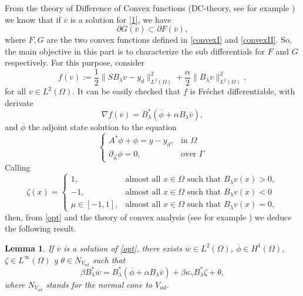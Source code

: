 \documentclass[11pt,a4paper]{amsart}
\newcommand{\om}{\Omega}
\newtheorem{lemma}{{Lemma}}
\newcommand{\norm}[1]{\lVert #1 \rVert}
\begin{document}
 From the theory of Difference of Convex functions (DC-theory, see for example \cite{dihn, merino})  we know that if $\overline{v}$ is a solution for \eqref{1}, we have 
\begin{equation}\label{opt}
    \partial G(\overline{v})\subset\partial F(\overline{v}),
\end{equation}
where $F, G$ are the two convex functions defined in \eqref{convexI} and \eqref{convexII}. So, the main objective in this part is to characterize the sub differentials for $F$ and $G$ respectively. For this purpose, consider
\[
	f(v):=\frac{1}{2}\norm{S	B_{\lambda}v-y_d}_{L^2(\om)}^2+\frac{\alpha}{2}\norm{	B_{\lambda}v}_{L^2(\om)}^2,
\]
for all $v\in L^2(\om)$. It can be easily checked that $f$ is Fréchet differentiable, with derivate 
\[\nabla f(\overline{v})=B_{\lambda}^*(\overline{\phi}+\alpha B_{\lambda}\overline{v}),
\]
and $\overline{\phi}$ the adjoint state solution to the equation 
\[
\begin{cases}
A^*\phi+\phi=y-y_{d}, &\mbox{in }\om\\
\partial_{\vec{n}}\phi=0,&\mbox{over }\Gamma
\end{cases}
\]
Calling 
\begin{equation}\label{zeta}
	\zeta(x)=\begin{cases}
		1, & \mbox{almost all }x\in \om \mbox{ such that } B_{\lambda}v(x)>0,\\
		-1, & \mbox{almost all }x\in \om \mbox{ such that }B_{\lambda}v(x)<0\\
		\mu \in [-1,1], &\mbox{almost all }x\in \om \mbox{ such that } B_{\lambda}v(x)=0,
	\end{cases}
\end{equation}
then, from \eqref{opt} and the theory of convex analysis (see for example \cite{rock}) we deduce the following result. 
 \begin{lemma}  
     If $\overline{v}$ is a solution of \eqref{opt}, there exists $\overline{w}\in L^2(\om)$, $\overline{\phi}\in H^1(\om)$, $\zeta\in L^{\infty}(\om)$ y $\theta \in N_{V_{ad}}$ such that     
     \begin{equation}\label{gradiente1}
         \beta B_{\lambda}^*\overline{w}=B_{\lambda}^*(\overline{\phi}+\alpha B_{\lambda}\overline{v})+\beta\kappa_{\gamma}B_{\lambda}^*\zeta+\theta,
     \end{equation}
     where $N_{V_{ad}}$ stands for the normal cone to $V_{ad}$.
\end{lemma}
\end{document}
